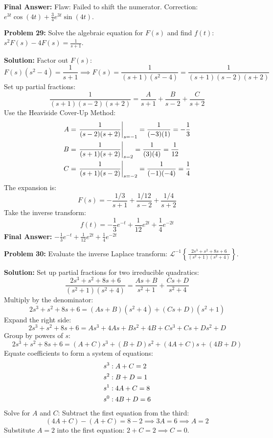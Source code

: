 \documentclass[11pt, letterpaper]{article}
\theoremstyle{definition}
\theoremstyle{remark}
\begin{document}
\textbf{Final Answer:} Flaw: Failed to shift the numerator. Correction: $e^{3t}\cos(4t) + \frac{3}{4}e^{3t}\sin(4t)$.

\vspace{1em}

\textbf{Problem 29:} Solve the algebraic equation for $F(s)$ and find $f(t)$: $\displaystyle s^2 F(s) - 4F(s) = \frac{1}{s+1}$.

\textbf{Solution:}
Factor out $F(s)$:
\[
F(s)(s^2 - 4) = \frac{1}{s+1} \implies F(s) = \frac{1}{(s+1)(s^2-4)} = \frac{1}{(s+1)(s-2)(s+2)}
\]
Set up partial fractions:
\[
\frac{1}{(s+1)(s-2)(s+2)} = \frac{A}{s+1} + \frac{B}{s-2} + \frac{C}{s+2}
\]
Use the Heaviside Cover-Up Method:
\begin{align*}
A &= \left. \frac{1}{(s-2)(s+2)} \right|_{s=-1} = \frac{1}{(-3)(1)} = -\frac{1}{3} \\ \relax
B &= \left. \frac{1}{(s+1)(s+2)} \right|_{s=2} = \frac{1}{(3)(4)} = \frac{1}{12} \\ \relax
C &= \left. \frac{1}{(s+1)(s-2)} \right|_{s=-2} = \frac{1}{(-1)(-4)} = \frac{1}{4}
\end{align*}
The expansion is:
\[
F(s) = -\frac{1/3}{s+1} + \frac{1/12}{s-2} + \frac{1/4}{s+2}
\]
Take the inverse transform:
\[
f(t) = -\frac{1}{3}e^{-t} + \frac{1}{12}e^{2t} + \frac{1}{4}e^{-2t}
\]
\textbf{Final Answer:} $\displaystyle -\frac{1}{3}e^{-t} + \frac{1}{12}e^{2t} + \frac{1}{4}e^{-2t}$

\vspace{1em}

\textbf{Problem 30:} Evaluate the inverse Laplace transform: $\displaystyle \mathcal{L}^{-1} \left\{ \frac{2s^3 + s^2 + 8s + 6}{(s^2+1)(s^2+4)} \right\}$.

\textbf{Solution:}
Set up partial fractions for two irreducible quadratics:
\[
\frac{2s^3 + s^2 + 8s + 6}{(s^2+1)(s^2+4)} = \frac{As + B}{s^2+1} + \frac{Cs + D}{s^2+4}
\]
Multiply by the denominator:
\[
2s^3 + s^2 + 8s + 6 = (As + B)(s^2+4) + (Cs + D)(s^2+1)
\]
Expand the right side:
\[
2s^3 + s^2 + 8s + 6 = As^3 + 4As + Bs^2 + 4B + Cs^3 + Cs + Ds^2 + D
\]
Group by powers of $s$:
\[
2s^3 + s^2 + 8s + 6 = (A+C)s^3 + (B+D)s^2 + (4A+C)s + (4B+D)
\]
Equate coefficients to form a system of equations:
\begin{align*}
s^3&: A + C = 2 \\ \relax
s^2&: B + D = 1 \\ \relax
s^1&: 4A + C = 8 \\ \relax
s^0&: 4B + D = 6
\end{align*}
Solve for $A$ and $C$: Subtract the first equation from the third:
\[
(4A + C) - (A + C) = 8 - 2 \implies 3A = 6 \implies A = 2
\]
Substitute $A=2$ into the first equation: $2 + C = 2 \implies C = 0$.
\end{document}
